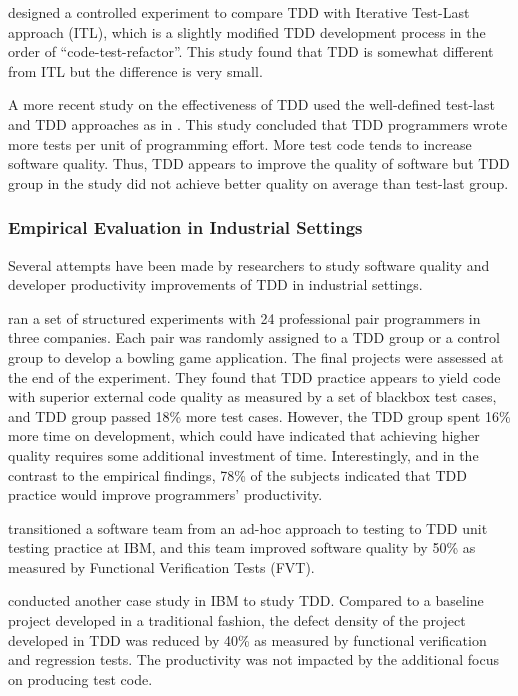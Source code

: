 \documentclass[smallextended]{svjour3}     %
\begin{document}
\cite{Matjaz:03} designed a controlled experiment to compare TDD with
Iterative Test-Last approach (ITL), which is a slightly modified TDD
development process in the order of ``code-test-refactor''.  This study
found that TDD is somewhat different from ITL but the difference is very
small.

A more recent study on the effectiveness of TDD 
\citep{Erdogmus:05} used the well-defined test-last
and TDD approaches as in \cite{Matjaz:03}. This study
concluded that TDD programmers wrote more tests per unit of programming
effort. More test code tends to increase software quality. Thus, TDD
appears to improve the quality of software but TDD group in the study did
not achieve better quality on average than test-last group.

\subsubsection{Empirical Evaluation in Industrial Settings}
Several attempts have been made by researchers to study software quality
and developer productivity improvements of TDD in industrial settings.  

\cite{George:04} ran a set of structured experiments
with 24 professional pair programmers in three companies. Each pair was
randomly assigned to a TDD group or a control group to develop a bowling
game application. The final projects were assessed at the end of the
experiment.  They found that TDD practice appears to yield code with
superior external code quality as measured by a set of blackbox test cases,
and TDD group passed 18\% more test cases. However, the TDD group spent
16\% more time on development, which could have indicated that achieving
higher quality requires some additional investment of time. Interestingly,
and in the contrast to the empirical findings, 78\% of the subjects
indicated that TDD practice would improve programmers' productivity.

\cite{Maximilien:03} transitioned a software team
from an ad-hoc approach to testing to TDD unit testing practice at IBM, and
this team improved software quality by 50\% as measured by Functional
Verification Tests (FVT).

\cite{Williams:03} conducted another case
study in IBM to study TDD. Compared to a baseline project developed in a 
traditional fashion, the defect density of the project developed 
in TDD was reduced by 40\% as measured by functional verification and 
regression tests. The productivity was not impacted by the additional 
focus on producing test code. 
\end{document}
